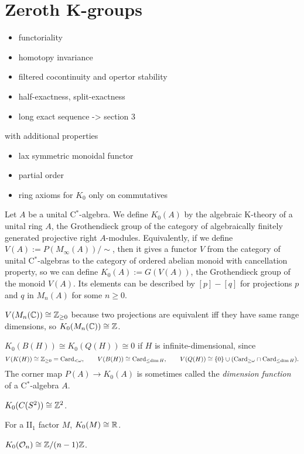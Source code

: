 \documentclass{../../large}
\begin{document}
\section{Zeroth K-groups}

\begin{itemize}
\item functoriality
\item homotopy invariance
\item filtered cocontinuity and opertor stability
\item half-exactness, split-exactness
\item long exact sequence -> section 3
\end{itemize}

with additional properties
\begin{itemize}
\item lax symmetric monoidal functor
\item partial order
\item ring axioms for $K_0$ only on commutatives
\end{itemize}




\begin{prb}
Let $A$ be a unital C$^*$-algebra.
We define $K_0(A)$ by the algebraic K-theory of a unital ring $A$, the Grothendieck group of the category of algebraically finitely generated projective right $A$-modules.
Equivalently, if we define $V(A):=P(M_\infty(A))/\sim$, then it gives a functor $V$ from the category of unital C$^*$-algebras to the category of ordered abelian monoid with cancellation property, so we can define $K_0(A):=G(V(A))$, the Grothendieck group of the monoid $V(A)$.
Its elements can be described by $[p]-[q]$ for projections $p$ and $q$ in $M_n(A)$ for some $n\ge0$.
\begin{parts}
\item $V(M_n(\mathbb{C}))\cong\mathbb{Z}_{\ge0}$ because two projections are equivalent iff they have same range dimensions, so $K_0(M_n(\mathbb{C}))\cong\mathbb{Z}$.
\item $K_0(B(H))\cong K_0(Q(H))\cong0$ if $H$ is infinite-dimensional, since
\[V(K(H))\cong\mathbb{Z}_{\ge0}=\mathrm{Card}_{<\omega},\qquad V(B(H))\cong\mathrm{Card}_{\le\dim H},\qquad V(Q(H))\cong\{0\}\cup(\mathrm{Card}_{\ge\omega}\cap\mathrm{Card}_{\le\dim H}).\]
The corner map $P(A)\to K_0(A)$ is sometimes called the \emph{dimension function} of a C$^*$-algebra $A$.
\item $K_0(C(S^2))\cong\mathbb{Z}^2$.
\item For a II$_1$ factor $M$, $K_0(M)\cong\mathbb{R}$.
\item $K_0(\mathcal{O}_n)\cong\mathbb{Z}/(n-1)\mathbb{Z}$.
\end{parts}
\end{prb}
\end{document}
